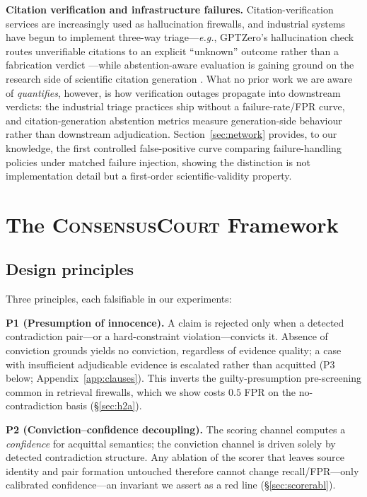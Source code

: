 \documentclass[11pt]{article}
\newcommand{\court}{\textsc{ConsensusCourt}}
\newcommand{\eg}{\emph{e.g.}}
\begin{document}
\textbf{Citation verification and infrastructure failures.}
Citation-verification services are increasingly used as hallucination
firewalls, and industrial systems have begun to implement three-way
triage—\eg{}, GPTZero's hallucination check routes unverifiable citations
to an explicit ``unknown'' outcome rather than a fabrication verdict
\citep{gptzero2026hallucination}—while abstention-aware evaluation is
gaining ground on the research side of scientific citation generation
\citep{saxena2024reasons}. What no prior work we are aware of
\emph{quantifies}, however, is how verification outages propagate into
downstream verdicts: the industrial triage practices ship without a
failure-rate/FPR curve, and citation-generation abstention metrics measure
generation-side behaviour rather than downstream adjudication.
Section~\ref{sec:network} provides, to our knowledge, the first controlled
false-positive curve comparing failure-handling policies under matched
failure injection, showing the distinction is not implementation detail
but a first-order scientific-validity property.

\section{The \court{} Framework}\label{sec:framework}

\subsection{Design principles}\label{sec:principles}

Three principles, each falsifiable in our experiments:

\textbf{P1 (Presumption of innocence).} A claim is rejected only when a
detected contradiction pair---or a hard-constraint violation---convicts it.
Absence of conviction grounds yields no conviction, regardless of evidence
quality; a case with insufficient adjudicable evidence is escalated rather
than acquitted (P3 below; Appendix~\ref{app:clauses}). This inverts the
guilty-presumption pre-screening common in retrieval firewalls, which we
show costs $0.5$ FPR on the no-contradiction basis (\S\ref{sec:h2a}).

\textbf{P2 (Conviction--confidence decoupling).} The scoring channel
computes a \emph{confidence} for acquittal semantics; the conviction channel
is driven solely by detected contradiction structure. Any ablation of the
scorer that leaves source identity and pair formation untouched therefore
cannot change recall/FPR—only calibrated confidence—an invariant we assert
as a red line (\S\ref{sec:scorerabl}).
\end{document}
